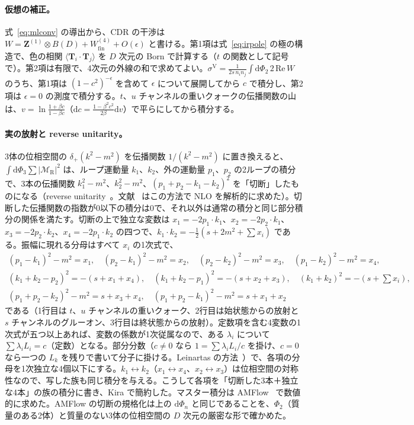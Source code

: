 \documentclass[a4paper,10pt]{ltjsarticle}
\newcommand{\dd}{\mathrm{d}}
\begin{document}
\paragraph{仮想の補正。}式~\eqref{eq:mlconv} の導出から、CDR の干渉は $W=\boldsymbol Z^{(1)}\otimes B(D)+W^{(4)}_{\mathrm{fin}}+O(\epsilon)$ と書ける。第1項は式~\eqref{eq:irpole} の極の構造で、色の相関 $\langle\boldsymbol T_i\!\cdot\!\boldsymbol T_j\rangle$ を $D$ 次元の Born で計算する（$t$ の関数として記号で）。第2項は有限で、4次元の外線の和で求めてよい。$\sigma^{\mathrm V}=\frac1{2s\,n_in_j}\int\dd\Phi_2\,2\,\mathrm{Re}\,W$ のうち、第1項は $(1-c^2)^{-\epsilon}$ を含めて $\epsilon$ について展開してから $c$ で積分し、第2項は $\epsilon=0$ の測度で積分する。$t$、$u$ チャンネルの重いクォークの伝播関数の山は、$v=\ln\frac{1+\beta c}{1-\beta c}$（$\dd c=\frac{1-\beta^2c^2}{2\beta}\dd v$）で平らにしてから積分する。

\paragraph{実の放射と reverse unitarity。}3体の位相空間の $\delta_+(k^2-m^2)$ を伝播関数 $1/(k^2-m^2)$ に置き換えると、$\int\dd\Phi_3\sum|\mathcal M_{\mathrm R}|^2$ は、ループ運動量 $k_1$、$k_2$、外の運動量 $p_1$、$p_2$ の2ループの積分で、3本の伝播関数 $k_1^2-m^2$、$k_2^2-m^2$、$(p_1+p_2-k_1-k_2)^2$ を「切断」したものになる（reverse unitarity~\cite{am02}。文献~\cite{cm10} はこの方法で NLO を解析的に求めた）。切断した伝播関数の指数が0以下の積分は0で、それ以外は通常の積分と同じ部分積分の関係を満たす。切断の上で独立な変数は $x_1=-2p_1\!\cdot\!k_1$、$x_2=-2p_2\!\cdot\!k_1$、$x_3=-2p_2\!\cdot\!k_2$、$x_4=-2p_1\!\cdot\!k_2$ の四つで、$k_1\!\cdot\!k_2=-\frac12(s+2m^2+\sum x_i)$ である。振幅に現れる分母はすべて $x_i$ の1次式で、
\begin{equation*}
\begin{gathered}
(p_1-k_1)^2-m^2=x_1,\quad (p_2-k_1)^2-m^2=x_2,\quad (p_2-k_2)^2-m^2=x_3,\quad (p_1-k_2)^2-m^2=x_4,\\
(k_1+k_2-p_2)^2=-(s+x_1+x_4),\quad (k_1+k_2-p_1)^2=-(s+x_2+x_3),\quad (k_1+k_2)^2=-(s+\textstyle\sum x_i),\\
(p_1+p_2-k_2)^2-m^2=s+x_3+x_4,\quad (p_1+p_2-k_1)^2-m^2=s+x_1+x_2
\end{gathered}
\end{equation*}
である（1行目は $t$、$u$ チャンネルの重いクォーク、2行目は始状態からの放射と $s$ チャンネルのグルーオン、3行目は終状態からの放射）。定数項を含む4変数の1次式が五つ以上あれば、変数の係数が1次従属なので、ある $\lambda_i$ について $\sum\lambda_iL_i=c$（定数）となる。部分分数（$c\ne0$ なら $1=\sum\lambda_iL_i/c$ を掛け、$c=0$ なら一つの $L_k$ を残りで書いて分子に掛ける。Leinartas の方法~\cite{raichev12}）で、各項の分母を1次独立な4個以下にする。$k_1\leftrightarrow k_2$（$x_1\leftrightarrow x_4$、$x_2\leftrightarrow x_3$）は位相空間の対称性なので、写した族も同じ積分を与える。こうして各項を「切断した3本＋独立な4本」の族の積分に書き、Kira で簡約した。マスター積分は AMFlow~\cite{amflow,amflowps} で数値的に求めた。AMFlow の切断の規格化は上の $\dd\Phi_n$ と同じであることを、$\Phi_2$（質量のある2体）と質量のない3体の位相空間の $D$ 次元の厳密な形で確かめた。
\end{document}
